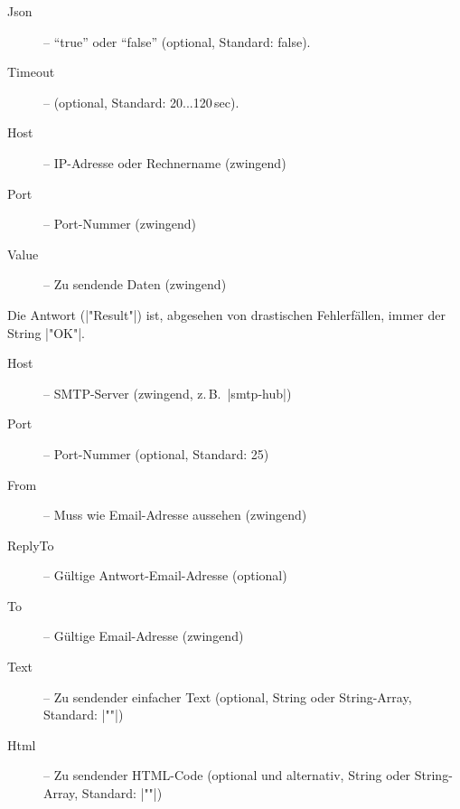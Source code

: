 \documentclass[titlepage=false,toc=nobibliography]{vl-report}
\newcommand*\action[1]{\fbox{\nolinkurl{#1}}\medskip\par}
\begin{document}
\begin{description}
\begin{description}
\begin{description}
        \item[Json] -- "`true"' oder "`false"' (optional, Standard: false).

        \item[Timeout] -- (optional, Standard: 20...120\,sec).

      \end{description}

    \item \action{UDP}

      \begin{description}

        \item[Host] -- IP-Adresse oder Rechnername (zwingend)

        \item[Port] -- Port-Nummer (zwingend)

        \item[Value] -- Zu sendende Daten (zwingend)

      \end{description}

      \noindent Die Antwort (|"Result"|) ist, abgesehen von drastischen
      Fehlerfällen, immer der String |"OK"|.

    \item \action{EMAIL}

      \begin{description}

        \item[Host] -- SMTP-Server (zwingend, z.\,B.\ |smtp-hub|)

        \item[Port] -- Port-Nummer (optional, Standard: 25)

        \item[From] -- Muss wie Email-Adresse aussehen (zwingend)
        
        \item[ReplyTo] -- Gültige Antwort-Email-Adresse (optional)

        \item[To] -- Gültige Email-Adresse (zwingend)

        \item[Text] -- Zu sendender einfacher Text (optional, 
          String oder String-Array, Standard: |""|)
        
        \item[Html] -- Zu sendender HTML-Code (optional und alternativ, 
          String oder String-Array, Standard: |""|)
        

\end{description}
\end{description}
\end{description}
\end{document}

